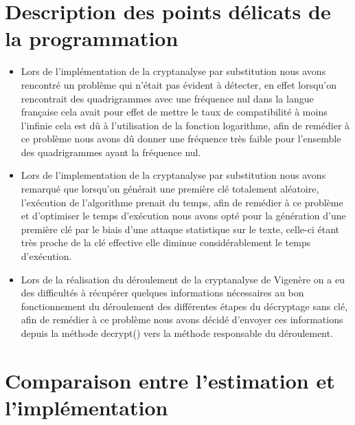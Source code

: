 \documentclass[11pt]{article}
\begin{document}
\begin{enumerate}
\section{Description des points délicats de la programmation}
\begin{itemize}[label=\textbullet]
\item Lors de l’implémentation de la cryptanalyse par substitution nous avons rencontré un problème qui n’était pas évident à détecter, en effet lorsqu’on rencontrait des quadrigrammes avec une fréquence nul dans la langue française cela avait pour effet de mettre le taux de compatibilité à moins l’infinie cela est dû à l’utilisation de la fonction logarithme, afin de remédier à ce problème nous avons dû donner une fréquence très faible pour l’ensemble
des quadrigrammes ayant la fréquence nul.
\item Lors de l'implementation de la cryptanalyse par substitution nous avons remarqué que lorsqu'on générait une première clé totalement aléatoire, l'exécution de l'algorithme prenait du temps, afin de remédier à ce problème et d'optimiser le temps d'exécution nous avons opté pour la génération d'une première clé par le biais d'une attaque statistique sur le texte, celle-ci étant très proche de la clé effective elle diminue considérablement le temps d'exécution.
\item Lors de la réalisation du déroulement de la cryptanalyse de Vigenère on a eu des difficultés à récupérer quelques informations nécessaires au bon fonctionnement du déroulement des
différentes étapes du décryptage sans clé, afin de remédier à ce problème nous avons décidé d’envoyer ces informations depuis la méthode decrypt() vers la méthode responsable du déroulement.
\end{itemize}
\section{Comparaison entre l'estimation et l'implémentation}


\end{enumerate}
\end{document}
